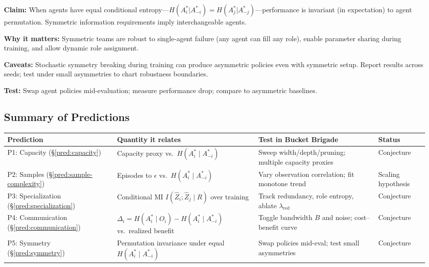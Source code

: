 \documentclass[10pt, letterpaper]{article}
\begin{document}
\textbf{Claim:} When agents have equal conditional entropy---$H(A_i^*|A_{-i}^*) = H(A_j^*|A_{-j}^*)$---performance is invariant (in expectation) to agent permutation. Symmetric information requirements imply interchangeable agents.

\textbf{Why it matters:} Symmetric teams are robust to single-agent failure (any agent can fill any role), enable parameter sharing during training, and allow dynamic role assignment.

\textbf{Caveats:} Stochastic symmetry breaking during training can produce asymmetric policies even with symmetric setup. Report results across seeds; test under small asymmetries to chart robustness boundaries.

\textbf{Test:} Swap agent policies mid-evaluation; measure performance drop; compare to asymmetric baselines.

\subsection{Summary of Predictions}

\begin{center}
\small
\begin{tabular}{p{2.4cm} p{4.4cm} p{4.8cm} p{2.4cm}}
\toprule
\textbf{Prediction} & \textbf{Quantity it relates} & \textbf{Test in Bucket Brigade} & \textbf{Status} \\
\midrule
P1: Capacity (\S\ref{pred:capacity}) & Capacity proxy vs.\ $H(A_i^* \mid A_{-i}^*)$ & Sweep width/depth/pruning; multiple capacity proxies & Conjecture \\
P2: Samples (\S\ref{pred:sample-complexity}) & Episodes to $\epsilon$ vs.\ $H(A_i^* \mid A_{-i}^*)$ & Vary observation correlation; fit monotone trend & Scaling hypothesis \\
P3: Specialization (\S\ref{pred:specialization}) & Conditional MI $I(\hat{Z}_i; \hat{Z}_j \mid R)$ over training & Track redundancy, role entropy, ablate $\lambda_\text{red}$ & Conjecture \\
P4: Communication (\S\ref{pred:communication}) & $\Delta_i = H(A_i^*\mid O_i) - H(A_i^*\mid A_{-i}^*)$ vs.\ realized benefit & Toggle bandwidth $B$ and noise; cost--benefit curve & Conjecture \\
P5: Symmetry (\S\ref{pred:symmetry}) & Permutation invariance under equal $H(A_i^*\mid A_{-i}^*)$ & Swap policies mid-eval; test small asymmetries & Conjecture \\
\bottomrule
\end{tabular}
\end{center}
\end{document}
